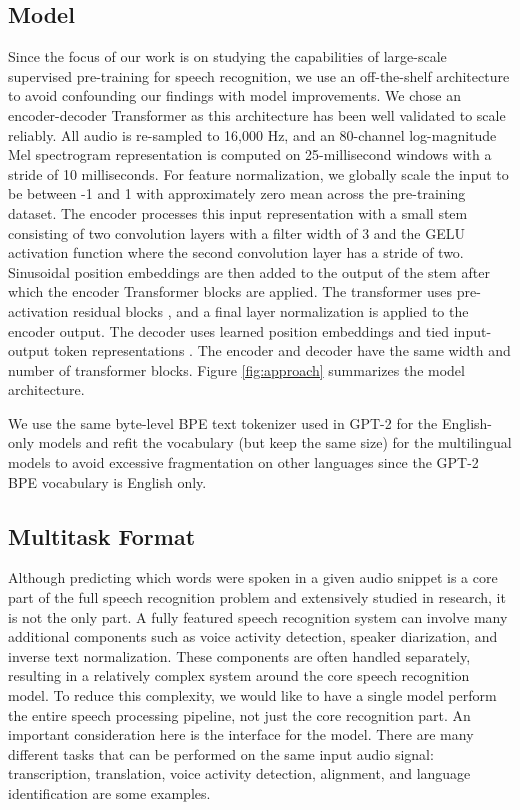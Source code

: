 \subsection{Model}\label{subsec:model}

Since the focus of our work is on studying the capabilities of large-scale supervised pre-training for speech recognition, we use an off-the-shelf architecture to avoid confounding our findings with model improvements. We chose an encoder-decoder Transformer \cite{vaswani2017transformer} as this architecture has been well validated to scale reliably. All audio is re-sampled to 16,000 Hz, and an 80-channel log-magnitude Mel spectrogram representation is computed on 25-millisecond windows with a stride of 10 milliseconds. For feature normalization, we globally scale the input to be between -1 and 1 with approximately zero mean across the pre-training dataset. The encoder processes this input representation with a small stem consisting of two convolution layers with a filter width of 3 and the GELU activation function \cite{hendrycks2016gaussian} where the second convolution layer has a stride of two. Sinusoidal position embeddings are then added to the output of the stem after which the encoder Transformer blocks are applied. The transformer uses pre-activation residual blocks \cite{child2019generating}, and a final layer normalization is applied to the encoder output. The decoder uses learned position embeddings and tied input-output token representations \cite{press-wolf-2017-using}. The encoder and decoder have the same width and number of transformer blocks.
Figure \ref{fig:approach} summarizes the model architecture.

We use the same byte-level BPE text tokenizer used in GPT-2 \cite{sennrich2015neural,radford2019gpt2} for the English-only models and refit the vocabulary (but keep the same size) for the multilingual models to avoid excessive fragmentation on other languages since the GPT-2 BPE vocabulary is English only.

\subsection{Multitask Format}\label{sec:multitask}

Although predicting which words were spoken in a given audio snippet is a core part of the full speech recognition problem and extensively studied in research, it is not the only part. A fully featured speech recognition system can involve many additional components such as voice activity detection, speaker diarization, and inverse text normalization. These components are often handled separately, resulting in a relatively complex system around the core speech recognition model. To reduce this complexity, we would like to have a single model perform the entire speech processing pipeline, not just the core recognition part. An important consideration here is the interface for the model. There are many different tasks that can be performed on the same input audio signal: transcription, translation, voice activity detection, alignment, and language identification are some examples. 

